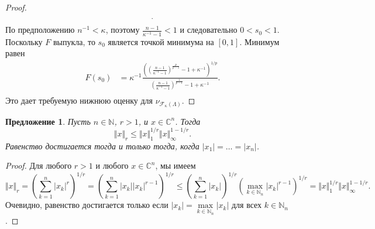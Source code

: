 \documentclass[12pt]{article}
\newtheorem{proposition}[theorem]{Предложение}
\begin{document}
\begin{proof}
\[{        }.\\
    \]
    По предположению $n^{-1}<\kappa$, поэтому $\frac{n-1}{\kappa^{-1}-1}<1$ и 
    следовательно $0<s_0<1$. Поскольку $F$ выпукла, то $s_0$ является точкой 
    минимума на $[0,1]$. Минимум равен
    \[
    \begin{aligned}
        F(s_0)
        &=\kappa^{-1}
            \frac{
                \left(
                    \left(\frac{n-1}{\kappa^{-1}-1}
                    \right)^{\frac{p}{p-1}}
                    -1+\kappa^{-1}
                \right)^{1/p}
            }{
                \left(\frac{n-1}{\kappa^{-1}-1}
                \right)^{\frac{1}{p-1}}
                -1+\kappa^{-1}
            }. \\
    \end{aligned}
    \]
    Это дает требуемую нижнюю оценку 
    для $\nu_{\mathcal{F}_{\kappa}(\Lambda)}$.
\end{proof}

\begin{proposition}\label{SpclLyapIneq}
    Пусть $n\in\mathbb{N}$, $r>1$, и $x\in\mathbb{C}^n$. Тогда
    \[
        \Vert x\Vert_r\leq \Vert x\Vert_1^{1/r}\Vert x\Vert_\infty^{1-1/r}.
    \]
    Равенство достигается тогда и только тогда, когда $|x_1|=\ldots=|x_n|$.
\end{proposition}
\begin{proof}
    Для любого $r>1$ и любого $x\in\mathbb{C}^n$, мы имеем
    \[
        \Vert x\Vert_r
        =\left(\sum_{k=1}^n |x_k|^r \right)^{1/r}
        =\left(\sum_{k=1}^n |x_k| |x_k|^{r-1} \right)^{1/r}
        \leq\left(\sum_{k=1}^n |x_k| \right)^{1/r} 
        \left(\max\limits_{k\in\mathbb{N}_n}|x_k|^{r-1}\right)^{1/r}
        =\Vert x\Vert_1^{1/r}\Vert x\Vert_\infty^{1-1/r}.
    \]
    Очевидно, равенство достигается только 
    если $|x_k|=\max\limits_{k\in\mathbb{N}_n}|x_k|$ 
    для всех $k\in\mathbb{N}_n$.
\end{proof}
\end{document}
